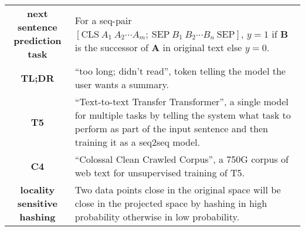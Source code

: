 \begin{table}[htpb]
{\begin{tabular}{cp{32em}}
        \textbf{next sentence prediction task} & For a seq-pair $[\mathrm{CLS}~A_1~A_2\cdots A_m;~\mathrm{SEP}~B_1~B_2\cdots B_n~\mathrm{SEP}]$, 
        $y=1$ if $\mathbf{B}$ is the successor of $\mathbf{A}$ in original text else $y=0$. \\
        \textbf{TL;DR} & ``too long; didn't read'', token telling the model the user wants a summary. \\
        \textbf{T5} & ``Text-to-text Transfer Transformer'', a single model for multiple tasks 
        by telling the system what task to perform as part of the input sentence and then training it as a seq2seq model. \\
        \textbf{C4} & ``Colossal Clean Crawled Corpus'', a 750G corpus of web text for unsupervised training of T5. \\
        \textbf{locality sensitive hashing} & Two data points close in the original space will be close in the projected space by hashing in high probability otherwise in low probability. \\
        \bottomrule
    \end{tabular}}
    \label{tab:nn4imgseq}
\end{table}


